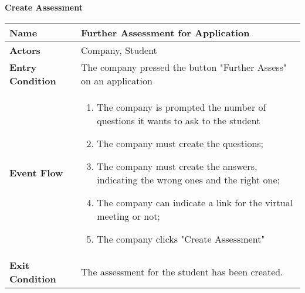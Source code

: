 \begin{enumerate}[label=\textbf{[US\arabic*]}, left = 0pt, align = left, resume]
            \newpage
            \item \textbf{Create Assessment}
            
            \begin{longtable}{|l|p{11cm}|}  
                \hline
                \textbf{Name} & 
                    \textbf{Further Assessment for Application} \\
                \hline
                
                \textbf{Actors} & 
                    Company, Student\\
                \hline
                
                \textbf{Entry Condition} & 
                    The company pressed the button "Further Assess" on an application \\
                \hline
                
                \textbf{Event Flow} &
                    \begin{enumerate}[label=\arabic*., itemsep=0.2em]
                        \item The company is prompted the number of questions it wants to ask to the student
                        \item The company must create the questions;
                        \item The company must create the answers, indicating the wrong ones and the right one;
                        \item The company can indicate a link for the virtual meeting or not;
                        \item The company clicks "Create Assessment" 
                    \end{enumerate} \\
                \hline
                
                \textbf{Exit Condition} & 
                    The assessment for the student has been created. \\
                \hline
                

\end{longtable}
\end{enumerate}
